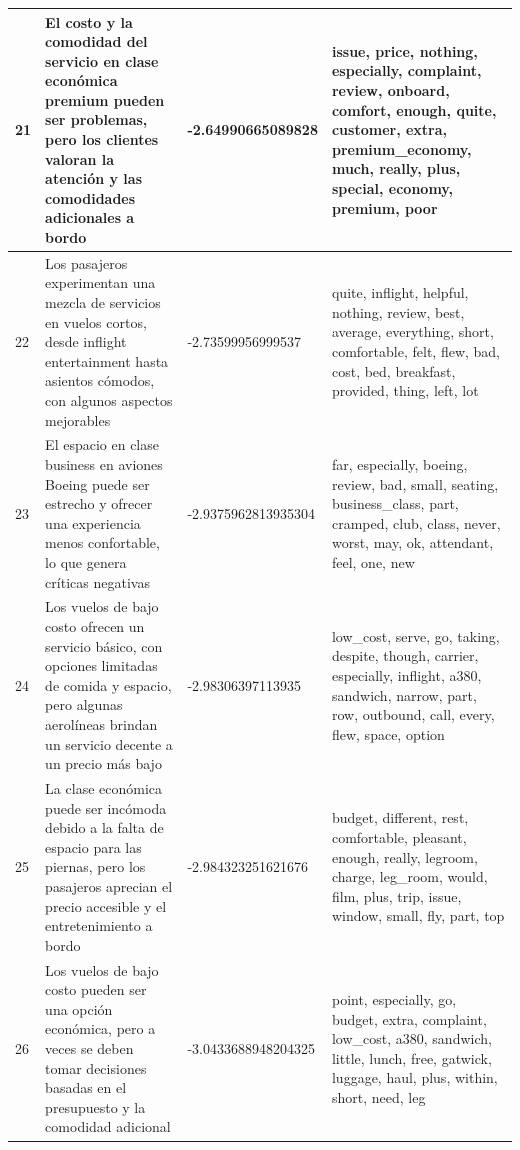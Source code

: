 \documentclass{report}
\begin{document}
\begin{longtable}{|p{1cm}|p{4cm}|p{4cm}|p{6cm}|}
                    \hline
                    21 & El costo y la comodidad del servicio en clase económica premium pueden ser problemas, pero los clientes valoran la atención y las comodidades adicionales a bordo & -2.64990665089828 & issue, price, nothing, especially, complaint, review, onboard, comfort, enough, quite, customer, extra, premium\_economy, much, really, plus, special, economy, premium, poor \\
                    \hline
                    22 & Los pasajeros experimentan una mezcla de servicios en vuelos cortos, desde inflight entertainment hasta asientos cómodos, con algunos aspectos mejorables & -2.73599956999537 & quite, inflight, helpful, nothing, review, best, average, everything, short, comfortable, felt, flew, bad, cost, bed, breakfast, provided, thing, left, lot \\
                    \hline
                    23 & El espacio en clase business en aviones Boeing puede ser estrecho y ofrecer una experiencia menos confortable, lo que genera críticas negativas & -2.9375962813935304 & far, especially, boeing, review, bad, small, seating, business\_class, part, cramped, club, class, never, worst, may, ok, attendant, feel, one, new \\
                    \hline
                    24 & Los vuelos de bajo costo ofrecen un servicio básico, con opciones limitadas de comida y espacio, pero algunas aerolíneas brindan un servicio decente a un precio más bajo & -2.98306397113935 & low\_cost, serve, go, taking, despite, though, carrier, especially, inflight, a380, sandwich, narrow, part, row, outbound, call, every, flew, space, option \\
                    \hline
                    25 & La clase económica puede ser incómoda debido a la falta de espacio para las piernas, pero los pasajeros aprecian el precio accesible y el entretenimiento a bordo & -2.984323251621676 & budget, different, rest, comfortable, pleasant, enough, really, legroom, charge, leg\_room, would, film, plus, trip, issue, window, small, fly, part, top \\
                    \hline
                    26 & Los vuelos de bajo costo pueden ser una opción económica, pero a veces se deben tomar decisiones basadas en el presupuesto y la comodidad adicional & -3.0433688948204325 & point, especially, go, budget, extra, complaint, low\_cost, a380, sandwich, little, lunch, free, gatwick, luggage, haul, plus, within, short, need, leg \\
                    \hline

\end{longtable}
\end{document}
